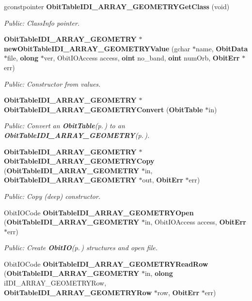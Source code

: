 \begin{CompactItemize}
gconstpointer {\bf Obit\-Table\-IDI\_\-ARRAY\_\-GEOMETRYGet\-Class} (void)
\begin{CompactList}\small\item\em Public: Class\-Info pointer. \item\end{CompactList}\item 
{\bf Obit\-Table\-IDI\_\-ARRAY\_\-GEOMETRY} $\ast$ {\bf new\-Obit\-Table\-IDI\_\-ARRAY\_\-GEOMETRYValue} (gchar $\ast$name, {\bf Obit\-Data} $\ast$file, {\bf olong} $\ast$ver, Obit\-IOAccess access, {\bf oint} no\_\-band, {\bf oint} num\-Orb, {\bf Obit\-Err} $\ast$err)
\begin{CompactList}\small\item\em Public: Constructor from values. \item\end{CompactList}\item 
{\bf Obit\-Table\-IDI\_\-ARRAY\_\-GEOMETRY} $\ast$ {\bf Obit\-Table\-IDI\_\-ARRAY\_\-GEOMETRYConvert} ({\bf Obit\-Table} $\ast$in)
\begin{CompactList}\small\item\em Public: Convert an {\bf Obit\-Table}{\rm (p.\,\pageref{structObitTable})} to an {\bf Obit\-Table\-IDI\_\-ARRAY\_\-GEOMETRY}{\rm (p.\,\pageref{structObitTableIDI__ARRAY__GEOMETRY})}. \item\end{CompactList}\item 
{\bf Obit\-Table\-IDI\_\-ARRAY\_\-GEOMETRY} $\ast$ {\bf Obit\-Table\-IDI\_\-ARRAY\_\-GEOMETRYCopy} ({\bf Obit\-Table\-IDI\_\-ARRAY\_\-GEOMETRY} $\ast$in, {\bf Obit\-Table\-IDI\_\-ARRAY\_\-GEOMETRY} $\ast$out, {\bf Obit\-Err} $\ast$err)
\begin{CompactList}\small\item\em Public: Copy (deep) constructor. \item\end{CompactList}\item 
Obit\-IOCode {\bf Obit\-Table\-IDI\_\-ARRAY\_\-GEOMETRYOpen} ({\bf Obit\-Table\-IDI\_\-ARRAY\_\-GEOMETRY} $\ast$in, Obit\-IOAccess access, {\bf Obit\-Err} $\ast$err)
\begin{CompactList}\small\item\em Public: Create {\bf Obit\-IO}{\rm (p.\,\pageref{structObitIO})} structures and open file. \item\end{CompactList}\item 
Obit\-IOCode {\bf Obit\-Table\-IDI\_\-ARRAY\_\-GEOMETRYRead\-Row} ({\bf Obit\-Table\-IDI\_\-ARRAY\_\-GEOMETRY} $\ast$in, {\bf olong} i\-IDI\_\-ARRAY\_\-GEOMETRYRow, {\bf Obit\-Table\-IDI\_\-ARRAY\_\-GEOMETRYRow} $\ast$row, {\bf Obit\-Err} $\ast$err)

\end{CompactItemize}
